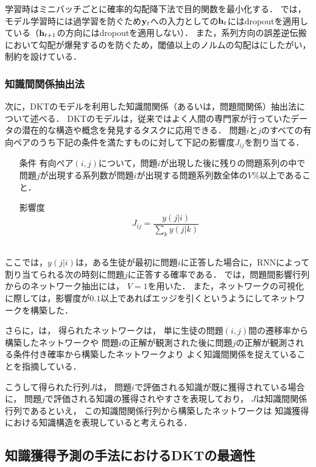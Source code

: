 学習時はミニバッチごとに確率的勾配降下法で目的関数を最小化する．
\cite{piech2015deep}では，モデル学習時には過学習を防ぐため${\bf y}_t$への入力としての${\bf h}_t$にはdropout\cite{srivastava2014dropout}を適用している（${\bf h}_{t+1}$の方向にはdropoutを適用しない）．
また，系列方向の誤差逆伝搬\cite{werbos1990backpropagation}において勾配が爆発するのを防ぐため，閾値以上のノルムの勾配は\cite{pascanu2013difficulty}にしたがい，制約を設けている．


\subsubsection{知識間関係抽出法}
次に，DKTのモデルを利用した知識間関係（あるいは，問題間関係）抽出法について述べる．
DKTのモデルは，従来ではよく人間の専門家が行っていたデータの潜在的な構造や概念を発見するタスクに応用できる．
問題$i$と$j$のすべての有向ペアのうち下記の条件を満たすものに対して下記の影響度$J_{ij}$を割り当てる．\\
\begin{itemize}
	\item [条件]有向ペア$(i, j)$について，問題$i$が出現した後に残りの問題系列の中で問題$j$が出現する系列数が問題$i$が出現する問題系列数全体の$V\%$以上であること．
	\item[影響度]
$$J_{ij} = \frac{y(j|i)}{\sum_k y(j|k)}$$\\
\end{itemize}
ここでは，$y(j|i)$は，ある生徒が最初に問題$i$に正答した場合に，RNNによって割り当てられる次の時刻に問題$j$に正答する確率である．
\cite{piech2015deep}では，問題間影響行列からのネットワーク抽出には，
$V=1$を用いた．
また，ネットワークの可視化に際しては，影響度が$0.1$以上であればエッジを引くというようにしてネットワークを構築した．

さらに，\cite{piech2015deep}は，
得られたネットワークは，
単に生徒の問題$(i, j)$間の遷移率から構築したネットワークや
問題$i$の正解が観測された後に問題$j$の正解が観測される条件付き確率から構築したネットワークより
よく知識間関係を捉えていることを指摘している．


こうして得られた行列$J$は，
問題$i$で評価される知識が既に獲得されている場合に，
問題$j$で評価される知識の獲得されやすさを表現しており，
$J$は知識間関係行列であるといえ，
この知識間関係行列から構築したネットワークは
知識獲得における知識構造を表現していると考えられる．


\subsection{知識獲得予測の手法におけるDKTの最適性}

